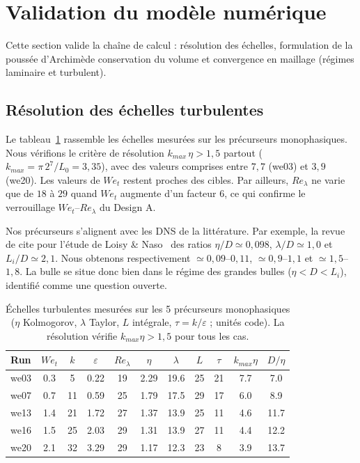 \section{Validation du modèle numérique}

Cette section valide la chaîne de calcul : résolution des échelles, formulation de la poussée d’Archimède conservation du volume et convergence en maillage (régimes laminaire et turbulent).

\subsection{Résolution des échelles turbulentes}

Le tableau~\ref{tab:designA_resol} rassemble les échelles mesurées sur les précurseurs monophasiques. Nous vérifions le critère de résolution $k_{max}\,\eta > 1{,}5$ partout ($k_{max}=\pi\,2^7/L_0 = 3{,}35$), avec des valeurs comprises entre $7{,}7$ (we03) et $3{,}9$ (we20). Les valeurs de $We_t$ restent proches des cibles. Par ailleurs, $Re_\lambda$ ne varie que de $18$ à $29$ quand $We_t$ augmente d'un facteur $6$, ce qui confirme le verrouillage $We_t$--$Re_\lambda$ du Design A.

Nos précurseurs s'alignent avec les DNS de la littérature. Par exemple, la revue de \cite{legendre2025} cite pour l'étude de Loisy \& Naso~\cite{loisy2017} des ratios $\eta/D\simeq0{,}098$, $\lambda/D\simeq1{,}0$ et $L_i/D\simeq2{,}1$. Nous obtenons respectivement ${\simeq}0{,}09$--$0{,}11$, ${\simeq}0{,}9$--$1{,}1$ et ${\simeq}1{,}5$--$1{,}8$. La bulle se situe donc bien dans le régime des grandes bulles ($\eta < D < L_i$), identifié comme une question ouverte.

\begin{table}[htbp]
    \centering
    \renewcommand{\arraystretch}{1.3}
    \begin{tabular}{lcccccccccc}
        \toprule
        Run & $We_t$ & $k$ & $\varepsilon$ & $Re_\lambda$ & $\eta$ & $\lambda$ & $L$ & $\tau$ & $k_{max}\eta$ & $D/\eta$ \\
        \midrule
        we03 & 0.3 & 5 & 0.22 & 19 & 2.29 & 19.6 & 25 & 21 & 7.7 & 7.0 \\
        we07 & 0.7 & 11 & 0.59 & 25 & 1.79 & 17.5 & 29 & 17 & 6.0 & 8.9 \\
        we13 & 1.4 & 21 & 1.72 & 27 & 1.37 & 13.9 & 25 & 11 & 4.6 & 11.7 \\
        we16 & 1.5 & 25 & 2.03 & 29 & 1.31 & 13.9 & 27 & 11 & 4.4 & 12.2 \\
        we20 & 2.1 & 32 & 3.29 & 29 & 1.17 & 12.3 & 23 & 8 & 3.9 & 13.7 \\
        \bottomrule
    \end{tabular}
    \caption{Échelles turbulentes mesurées sur les 5 précurseurs monophasiques ($\eta$ Kolmogorov, $\lambda$ Taylor, $L$ intégrale, $\tau=k/\varepsilon$ ; unités code). La résolution vérifie $k_{max}\eta>1{,}5$ pour tous les cas.}
    \label{tab:designA_resol}
\end{table}

